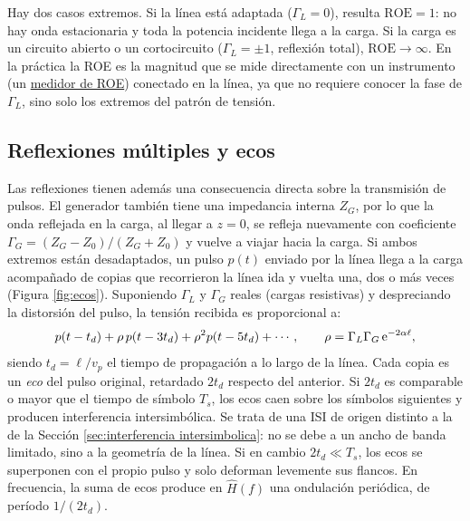 Hay dos casos extremos. Si la línea está adaptada ($\Gamma_L=0$), resulta $\mathrm{ROE}=1$: no hay onda estacionaria y toda la potencia incidente llega a la carga. Si la carga es un circuito abierto o un cortocircuito ($\Gamma_L=\pm 1$, reflexión total), $\mathrm{ROE}\to\infty$. En la práctica la ROE es la magnitud que se mide directamente con un instrumento (un \href{https://en.wikipedia.org/wiki/SWR_meter}{medidor de ROE}) conectado en la línea, ya que no requiere conocer la fase de $\Gamma_L$, sino solo los extremos del patrón de tensión.

\subsection*{Reflexiones múltiples y ecos}

Las reflexiones tienen además una consecuencia directa sobre la transmisión de pulsos. El generador también tiene una impedancia interna $Z_G$, por lo que la onda reflejada en la carga, al llegar a $z=0$, se refleja nuevamente con coeficiente $\Gamma_G=(Z_G-Z_0)/(Z_G+Z_0)$ y vuelve a viajar hacia la carga. Si ambos extremos están desadaptados, un pulso $p(t)$ enviado por la línea llega a la carga acompañado de copias que recorrieron la línea ida y vuelta una, dos o más veces (Figura \ref{fig:ecos}). Suponiendo $\Gamma_L$ y $\Gamma_G$ reales (cargas resistivas) y despreciando la distorsión del pulso, la tensión recibida es proporcional a:
\begin{equation*}
    p(t-t_d) + \rho\, p(t-3t_d) + \rho^2 p(t-5t_d) + \cdots, \qquad \rho = \Gamma_L\Gamma_G\,\mathrm{e}^{-2\alpha\ell},
\end{equation*}
siendo $t_d=\ell/v_p$ el tiempo de propagación a lo largo de la línea. Cada copia es un \emph{eco} del pulso original, retardado $2t_d$ respecto del anterior. Si $2t_d$ es comparable o mayor que el tiempo de símbolo $T_s$, los ecos caen sobre los símbolos siguientes y producen interferencia intersimbólica. Se trata de una ISI de origen distinto a la de la Sección \ref{sec:interferencia intersimbolica}: no se debe a un ancho de banda limitado, sino a la geometría de la línea. Si en cambio $2t_d\ll T_s$, los ecos se superponen con el propio pulso y solo deforman levemente sus flancos. En frecuencia, la suma de ecos produce en $\hat H(f)$ una ondulación periódica, de período $1/(2t_d)$.

